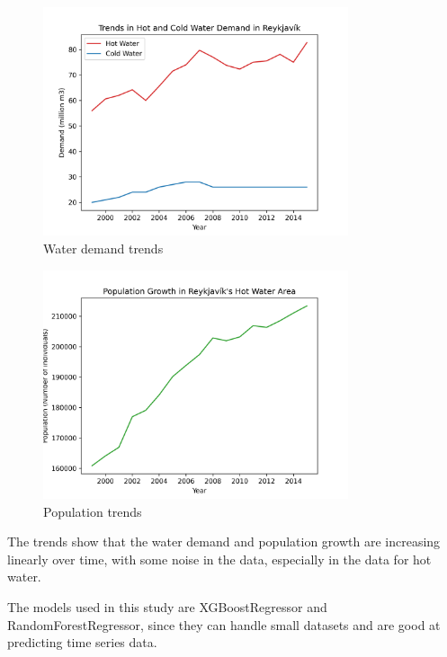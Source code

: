 \documentclass{article}
\begin{document}
\begin{figure}[h]
    \centering
    \includegraphics[width=0.8\textwidth]{../figures/trends-in-hot-and-cold-water-demand.png}
    \caption{Water demand trends}
    \label{fig:water-demand-trends}
\end{figure}

\begin{figure}[h]
    \centering
    \includegraphics[width=0.8\textwidth]{../figures/population-growth.png}
    \caption{Population trends}
    \label{fig:population-trends}
\end{figure}

The trends show that the water demand and population growth are increasing linearly over time, with some noise in the data, especially in the data for hot water.

The models used in this study are XGBoostRegressor and RandomForestRegressor, since they can handle small datasets and are good at predicting time series data.

\newpage
\end{document}
